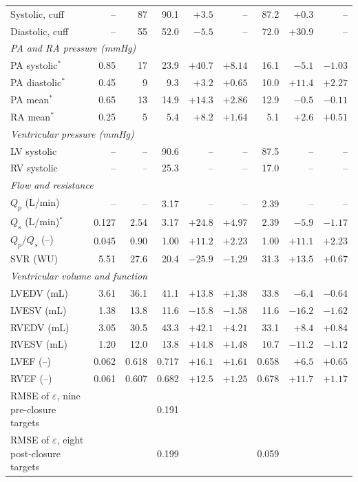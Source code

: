 \begin{table}[!htbp]
\begin{tabular}{lrrrrrrrr}
Systolic, cuff & -- & 87 & 90.1 & $+3.5$ & -- & 87.2 & $+0.3$ & -- \\
Diastolic, cuff & -- & 55 & 52.0 & $-5.5$ & -- & 72.0 & $+30.9$ & -- \\
\multicolumn{9}{l}{\emph{PA and RA pressure (mmHg)}} \\
PA systolic$^{*}$ & 0.85 & 17 & 23.9 & $+40.7$ & $+8.14$ & 16.1 & $-5.1$ & $-1.03$ \\
PA diastolic$^{*}$ & 0.45 & 9 & 9.3 & $+3.2$ & $+0.65$ & 10.0 & $+11.4$ & $+2.27$ \\
PA mean$^{*}$ & 0.65 & 13 & 14.9 & $+14.3$ & $+2.86$ & 12.9 & $-0.5$ & $-0.11$ \\
RA mean$^{*}$ & 0.25 & 5 & 5.4 & $+8.2$ & $+1.64$ & 5.1 & $+2.6$ & $+0.51$ \\
\multicolumn{9}{l}{\emph{Ventricular pressure (mmHg)}} \\
LV systolic & -- & -- & 90.6 & -- & -- & 87.5 & -- & -- \\
RV systolic & -- & -- & 25.3 & -- & -- & 17.0 & -- & -- \\
\multicolumn{9}{l}{\emph{Flow and resistance}} \\
$Q_p$ (L/min) & -- & -- & 3.17 & -- & -- & 2.39 & -- & -- \\
$Q_s$ (L/min)$^{*}$ & 0.127 & 2.54 & 3.17 & $+24.8$ & $+4.97$ & 2.39 & $-5.9$ & $-1.17$ \\
$Q_p/Q_s$ (--) & 0.045 & 0.90 & 1.00 & $+11.2$ & $+2.23$ & 1.00 & $+11.1$ & $+2.23$ \\
SVR (WU) & 5.51 & 27.6 & 20.4 & $-25.9$ & $-1.29$ & 31.3 & $+13.5$ & $+0.67$ \\
\multicolumn{9}{l}{\emph{Ventricular volume and function}} \\
LVEDV (mL) & 3.61 & 36.1 & 41.1 & $+13.8$ & $+1.38$ & 33.8 & $-6.4$ & $-0.64$ \\
LVESV (mL) & 1.38 & 13.8 & 11.6 & $-15.8$ & $-1.58$ & 11.6 & $-16.2$ & $-1.62$ \\
RVEDV (mL) & 3.05 & 30.5 & 43.3 & $+42.1$ & $+4.21$ & 33.1 & $+8.4$ & $+0.84$ \\
RVESV (mL) & 1.20 & 12.0 & 13.8 & $+14.8$ & $+1.48$ & 10.7 & $-11.2$ & $-1.12$ \\
LVEF (--) & 0.062 & 0.618 & 0.717 & $+16.1$ & $+1.61$ & 0.658 & $+6.5$ & $+0.65$ \\
RVEF (--) & 0.061 & 0.607 & 0.682 & $+12.5$ & $+1.25$ & 0.678 & $+11.7$ & $+1.17$ \\
\midrule
RMSE of $\varepsilon$, nine pre-closure targets & & & 0.191 & & & & & \\
RMSE of $\varepsilon$, eight post-closure targets & & & 0.199 & & & 0.059 & & \\
\bottomrule
\end{tabular}
\end{table}


